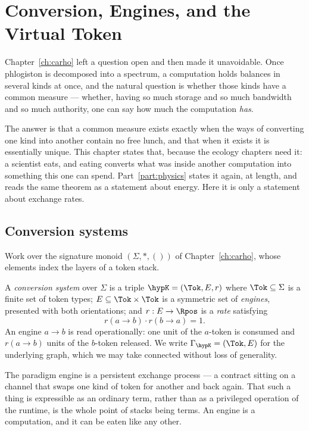 \chapter{Conversion, Engines, and the Virtual Token}
\label{ch:vtok}

Chapter~\ref{ch:carho} left a question open and then made it unavoidable.
Once phlogiston is decomposed into a spectrum, a computation holds
balances in several kinds at once, and the natural question is whether
those kinds have a common measure --- whether, having so much storage and
so much bandwidth and so much authority, one can say how much the
computation \emph{has}.

The answer is that a common measure exists exactly when the ways of
converting one kind into another contain no free lunch, and that when it
exists it is essentially unique.
This chapter states that, because the ecology chapters need it: a
scientist eats, and eating converts what was inside another computation
into something this one can spend.
Part~\ref{part:physics} states it again, at length, and reads the same
theorem as a statement about energy.
Here it is only a statement about exchange rates.

\section{Conversion systems}

Work over the signature monoid $(\Sigma, \ast, ())$ of
Chapter~\ref{ch:carho}, whose elements index the layers of a token stack.

\begin{definition}
\label{def:conv-system}
A \emph{conversion system} over $\Sigma$ is a triple
$\hypK = (\Tok, E, r)$ where $\Tok \subseteq \Sigma$ is a finite set of
token types; $E \subseteq \Tok \times \Tok$ is a symmetric set of
\emph{engines}, presented with both orientations; and
$r : E \to \Rpos$ is a \emph{rate} satisfying
\[
  r(a \to b) \cdot r(b \to a) = 1 .
\]
An engine $a \to b$ is read operationally: one unit of the $a$-token is
consumed and $r(a \to b)$ units of the $b$-token released.
We write $\Gamma_{\hypK} = (\Tok, E)$ for the underlying graph, which we
may take connected without loss of generality.
\end{definition}

The paradigm engine is a persistent exchange process --- a contract
sitting on a channel that swaps one kind of token for another and back
again.
That such a thing is expressible as an ordinary term, rather than as a
privileged operation of the runtime, is the whole point of stacks being
terms.
An engine is a computation, and it can be eaten like any other.

